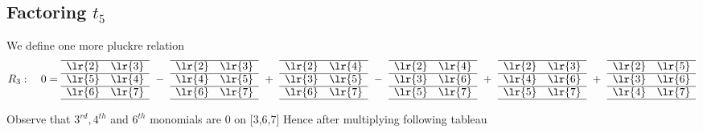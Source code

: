 \subsection{Factoring \(t_5\)}
We define one more pluckre relation
\begin{align*}
R_3:\ \ \ 0 = 
\begin{array}[c]{*{2}c}\cline{1-2}
\lr{2}&\lr{3}\\\cline{1-2}
\lr{5}&\lr{4}\\\cline{1-2}
\lr{6}&\lr{7}\\\cline{1-2}
\end{array}
\ -\ 
\begin{array}[c]{*{2}c}\cline{1-2}
\lr{2}&\lr{3}\\\cline{1-2}
\lr{4}&\lr{5}\\\cline{1-2}
\lr{6}&\lr{7}\\\cline{1-2}
\end{array}
\ +\ 
\begin{array}[c]{*{2}c}\cline{1-2}
\lr{2}&\lr{4}\\\cline{1-2}
\lr{3}&\lr{5}\\\cline{1-2}
\lr{6}&\lr{7}\\\cline{1-2}
\end{array}
\ -\ 
\begin{array}[c]{*{2}c}\cline{1-2}
\lr{2}&\lr{4}\\\cline{1-2}
\lr{3}&\lr{6}\\\cline{1-2}
\lr{5}&\lr{7}\\\cline{1-2}
\end{array}
\ +\ 
\begin{array}[c]{*{2}c}\cline{1-2}
\lr{2}&\lr{3}\\\cline{1-2}
\lr{4}&\lr{6}\\\cline{1-2}
\lr{5}&\lr{7}\\\cline{1-2}
\end{array}
\ +\ 
\begin{array}[c]{*{2}c}\cline{1-2}
\lr{2}&\lr{5}\\\cline{1-2}
\lr{3}&\lr{6}\\\cline{1-2}
\lr{4}&\lr{7}\\\cline{1-2}
\end{array}
\end{align*}

Observe that \(3^{rd},4^{th}\) and \(6^{th}\) monomials are \(0\) on [3,6,7]
Hence after multiplying following tableau  

